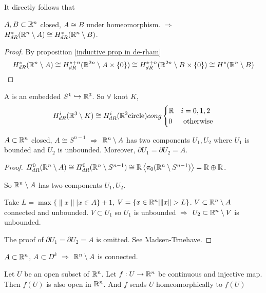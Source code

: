 It directly follows that
\begin{theorem}
     $ A,B\subset \mathbb R^n  $ closed,  $ A\cong B  $ under homeomorphism.  $ \Rightarrow  $  $ H_{dR}^*(\mathbb R^n\setminus A)\cong H_{dR}^*(\mathbb R^n\setminus B) $. 
\end{theorem}
\begin{proof}By proposition \ref{inductive prop in de-rham}
    \[H^*_{dR}(\mathbb R^n\setminus A)\cong H_{dR}^{*+n}(\mathbb R^{2n}\setminus A\times\{0\})\cong H_{dR}^{*+n}(\mathbb R^{2n}\setminus B\times\{0\})\cong H^*(\mathbb R^n\setminus B)\]
\end{proof}
\begin{example}
    A  is an embedded  $ S^1\hookrightarrow \mathbb R^3 $. So  $ \forall  $ knot  $ K $,
    \begin{equation}
        H_{dR}^i(\mathbb R^3\setminus K)\cong H_{dR}^i(\mathbb R^3\text{circle})cong \begin{cases}
            \mathbb R&i=0,1,2\\
            0&\text{ otherwise}
        \end{cases}
    \end{equation}  
\end{example}
\begin{corollary}
     $ A\subset \mathbb R^n $ closed,  $ A\cong S^{n-1} $ $ \Rightarrow  $  $ \mathbb R^n\setminus A  $ has two components  $ U_1,U_2 $ where  $ U_1 $ is bounded and  $ U_2 $ is unbounded. Moreover,      $ \partial U_1=\partial U_2=A $.  
\end{corollary}
\begin{proof}
     $ H_{dR}^0(\mathbb R^n\setminus A) \cong H_{dR}^0(\mathbb R^n\setminus S^{n-1})\cong \mathbb R\left<\pi_0(\mathbb R^n\setminus S^{n-1})\right>=\mathbb R\oplus \mathbb R$.

    So  $ \mathbb R^n\setminus A $ has two components  $ U_1,U_2 $.
    
    Take  $ L=\max\{\|x\||x\in A\}+1 $, $ V=\{x\in \Rbb^n|\|x\|>L\} $.  $ V\subset \mathbb R^n\setminus A $ connected and unbounded. $ V\subset U_1  $ so  $ U_1  $ is unbounded  $ \Rightarrow  $  $ U_2\subset \mathbb R^n\setminus V $ is unbounded.
    
    The proof of $ \partial U_1=\partial U_2=A $ is omitted. See Madsen-Trnehave.
\end{proof}
\begin{corollary}
     $ A\subset \mathbb R^n $,  $ A\subset D^k $ $ \Rightarrow  $  $ \mathbb R^n\setminus A $ is connected.   
\end{corollary}
\begin{theorem}\label{Invariance of domain}
    Let  $ U  $ be an open subset of  $ \mathbb R^n  $. Let $ f:U\rightarrow \mathbb R^n  $ be continuous and injective map. Then  $ f(U) $ is also open in  $ \mathbb R^n $. And  $ f  $ sends  $ U  $ homeomorphically to  $ f(U) $  
\end{theorem}
